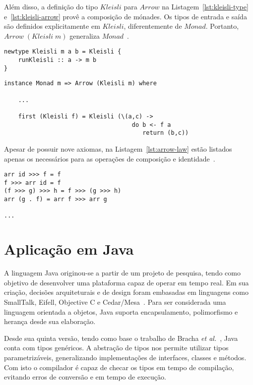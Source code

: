 \documentclass[10pt, conference]{IEEEtran}
\begin{document}
Além disso, a definição do tipo $Kleisli$ para $Arrow$ na Listagem~\ref{lst:kleisli-type} e~\ref{lst:kleisli-arrow} provê a composição de mónades. Os tipos de entrada e saída são definidos explicitamente em $Kleisli$, diferentemente de $Monad$. Portanto, ${Arrow\;(Kleisli\;m)}$ generaliza $Monad$~\cite{hughes2005programming}.

\begin{lstlisting}[caption={Definição do tipo $Kleisli$\protect\footref{fnt:prog-with-arrows}}, label={lst:kleisli-type}]
newtype Kleisli m a b = Kleisli { 
	runKleisli :: a -> m b 
}
\end{lstlisting}


\begin{lstlisting}[caption={Instância para $Monad$\protect\footref{fnt:prog-with-arrows}}, label={lst:kleisli-arrow}]
instance Monad m => Arrow (Kleisli m) where

	...
	
	first (Kleisli f) = Kleisli (\(a,c) -> 
									do b <- f a
									   return (b,c))
\end{lstlisting}

Apesar de possuir nove axiomas, na Listagem~\ref{lst:arrow-law} estão listados apenas os necessários para as operações de composição e identidade~\cite{lindley2011idioms}.

\begin{lstlisting}[caption={Leis para $Arrow$\protect\footref{fnt:arrows-and-idioms}}, label={lst:arrow-law}]
arr id >>> f = f
f >>> arr id = f
(f >>> g) >>> h = f >>> (g >>> h)
arr (g . f) = arr f >>> arr g

...

\end{lstlisting}

\section{Aplicação em Java}

A linguagem Java originou-se a partir de um projeto de pesquisa, tendo como
objetivo de desenvolver uma plataforma capaz de operar em tempo real. Em sua criação, decisões arquiteturais e de design foram embasadas em linguagens como SmallTalk, Eifell, Objective C e Cedar/Mesa~\cite{gosling1995java}. Para ser considerada uma linguagem orientada a objetos, Java suporta encapsulamento, polimorfismo e herança desde sua elaboração.

Desde sua quinta versão, tendo como base o trabalho de Bracha \textit{et al.}~\cite{bracha2004generics, bracha1998making}, Java conta com tipos genéricos. A abstração de tipos nos permite utilizar tipos parametrizáveis, generalizando implementações de interfaces, classes e métodos. Com isto o compilador é capaz de checar os tipos em tempo de compilação, evitando erros de conversão e em tempo de execução.
\end{document}
